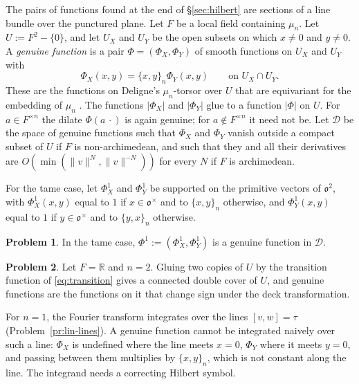 \documentclass[reqno]{amsart}
\newcommand{\Dc}{\mathcal{D}}
\newcommand{\oo}{\mathfrak{o}}
\numberwithin{equation}{section}
\theoremstyle{definition}
\newtheorem{problem}{Problem}[section]
\theoremstyle{plain}
\begin{document}
The pairs of functions found at the end of \S\ref{sec:hilbert} are sections of a line bundle over the punctured plane.  Let $F$ be a local field containing $\mu_n$.  Let $U := F^2 - \{0\}$, and let $U_X$ and $U_Y$ be the open subsets on which $x \neq 0$ and $y \neq 0$.  A \emph{genuine function} is a pair $\Phi = (\Phi_X, \Phi_Y)$ of smooth functions on $U_X$ and $U_Y$ with
\begin{equation}\label{eq:transition}
  \Phi_X(x, y) = \{x, y\}_n \Phi_Y(x, y) \qquad \text{on } U_X \cap U_Y.
\end{equation}
These are the functions on Deligne's $\mu_n$-torsor over $U$ that are equivariant for the embedding of $\mu_n$ \cite[\S\S1.12, 3.7]{Del}.  The functions $\lvert \Phi_X \rvert$ and $\lvert \Phi_Y \rvert$ glue to a function $\lvert \Phi \rvert$ on $U$.  For $a \in F^{\times n}$ the dilate $\Phi(a \, \cdot)$ is again genuine; for $a \notin F^{\times n}$ it need not be.  Let $\Dc$ be the space of genuine functions such that $\Phi_X$ and $\Phi_Y$ vanish outside a compact subset of $U$ if $F$ is non-archimedean, and such that they and all their derivatives are $O(\min(\lVert v \rVert^N, \lVert v \rVert^{-N}))$ for every $N$ if $F$ is archimedean.

For the tame case, let $\Phi^1_X$ and $\Phi^1_Y$ be supported on the primitive vectors of $\oo^2$, with $\Phi^1_X(x, y)$ equal to $1$ if $x \in \oo^\times$ and to $\{x, y\}_n$ otherwise, and $\Phi^1_Y(x, y)$ equal to $1$ if $y \in \oo^\times$ and to $\{y, x\}_n$ otherwise.

\begin{problem}\label{pr:gen-primitive}
  In the tame case, $\Phi^1 := (\Phi^1_X, \Phi^1_Y)$ is a genuine function in $\Dc$.
\end{problem}

\begin{problem}\label{pr:gen-real}
  Let $F = \mathbb{R}$ and $n = 2$.  Gluing two copies of $U$ by the transition function of \eqref{eq:transition} gives a connected double cover of $U$, and genuine functions are the functions on it that change sign under the deck transformation.
\end{problem}

For $n = 1$, the Fourier transform integrates over the lines $[v, w] = \tau$ (Problem~\ref{pr:lin-lines}).  A genuine function cannot be integrated naively over such a line: $\Phi_X$ is undefined where the line meets $x = 0$, $\Phi_Y$ where it meets $y = 0$, and passing between them multiplies by $\{x, y\}_n$, which is not constant along the line.  The integrand needs a correcting Hilbert symbol.
\end{document}
